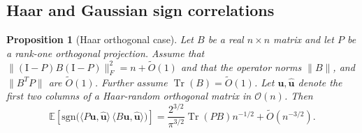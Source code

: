 \documentclass[reqno]{amsart}
\numberwithin{equation}{section}
\newcommand\E{\mathbb{E}}
\newcommand\bu{\bm{u}}
\newcommand\hu{\hat{\bm u}}
\newcommand\Tr{{\operatorname{Tr}}}
\newtheorem{proposition}[theorem]{Proposition}
\begin{document}
\subsection{Haar and Gaussian sign correlations}

\begin{proposition}[Haar orthogonal case]
Let $B$ be a real $n\times n$ matrix and let $P$ be a rank-one orthogonal projection.
Assume that $\|(\mathrm{I}-P)B(\mathrm{I}-P)\|_{F}^2=n+\tilde{O}(1)$ and that the operator norms
$\|B\|$, and $\|B^{T}P\|$ are $\tilde{O}(1)$. Further assume $\Tr(B)=\tilde{O}(1)$.
Let $\bu,\hu$ denote the first two columns of a Haar-random orthogonal matrix in $\mathcal{O}(n)$. Then
\[
\E\!\left[\mathrm{sgn}\!\big(\langle P\bu,\hu\rangle\,
\langle B\bu,\hu\rangle\big)\right]
=\frac{2^{3/2}}{\pi^{3/2}}\Tr(PB)n^{-1/2}+\tilde{O}(n^{-3/2}).
\]
\end{proposition}
\end{document}
